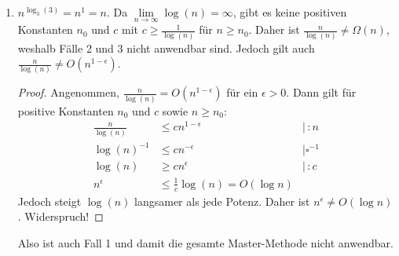 \documentclass[11pt,a4paper]{article}
\begin{document}
\begin{loesung}
\begin{enumerate}
\begin{enumerate}[label=\roman*)]
        \item $n^{\log_3(3)} = n^1 = n$.
        Da $\lim\limits_{n \rightarrow \infty} \log(n) = \infty$, gibt es keine positiven Konstanten $n_0$ und $c$ mit $c \geq \frac{1}{\log(n)}$ für $n \geq n_0$. Daher ist $\frac{n}{\log(n)} \neq \Omega(n)$, weshalb Fälle 2 und 3 nicht anwendbar sind.
        Jedoch gilt auch $\frac{n}{\log(n)} \neq O(n^{1 - \epsilon})$.
        \begin{proof}
            Angenommen, $\frac{n}{\log(n)} = O(n^{1 - \epsilon})$ für ein $\epsilon > 0$.
            Dann gilt für positive Konstanten $n_0$ und $c$ sowie $n \geq n_0$: 
            \begin{align*}
                \frac{n}{\log(n)} &\leq cn^{1 - \epsilon} &\mid \, : n \\
                \log(n)^{-1} &\leq cn^{-\epsilon} &\mid \square^{-1} \\
                \log(n) &\geq c n^{\epsilon} &\mid \, : c \\
                n^\epsilon &\leq \frac{1}{c} \log(n) = O(\log n)
            \end{align*}
            Jedoch steigt $\log(n)$ langsamer als jede Potenz.
            Daher ist $n^\epsilon \neq O(\log n)$. Widerspruch!
        \end{proof}
        Also ist auch Fall 1 und damit die gesamte Master-Methode nicht anwendbar.
    \end{enumerate}


\end{enumerate}
\end{loesung}
\end{document}
